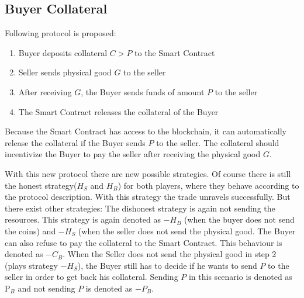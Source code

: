 \documentclass{cacthesis}
\begin{document}
\subsection{Buyer Collateral}
Following protocol is proposed:
\begin{enumerate}
    \item Buyer deposits collateral $C > P$ to the Smart Contract
    \item Seller sends physical good $G$ to the seller 
    \item After receiving $G$, the Buyer sends funds of amount $P$ to the seller 
    \item The Smart Contract releases the collateral of the Buyer
\end{enumerate}

Because the Smart Contract has access to the blockchain, it can automatically release the collateral if the Buyer sends $P$  to the seller. The collateral should incentivize the Buyer to pay the seller after receiving the physical good $G$.

With this new protocol there are new possible strategies. Of course there is still the honest strategy($H_S$ and $H_B$) for both players, where they behave according to the protocol description. With this strategy the trade unravels successfully.\newline
But there exist other strategies: The dishonest strategy is again not sending the resources. This strategy is again denoted as $-H_B$ (when the buyer does not send the coins) and $-H_S$ (when the seller does not send the physical good.\newline
The Buyer can also refuse to pay the collateral to the Smart Contract. This behaviour is denoted as $-C_B$.\newline
When the Seller does not send the physical good in step 2 (plays strategy $-H_S$), the Buyer still has to decide if he wants to send $P$ to the seller in order to get back his collateral. Sending $P$ in this scenario is denoted as P$_B$ and not sending $P$ is denoted as $-P_B$.\newline

\end{document}
